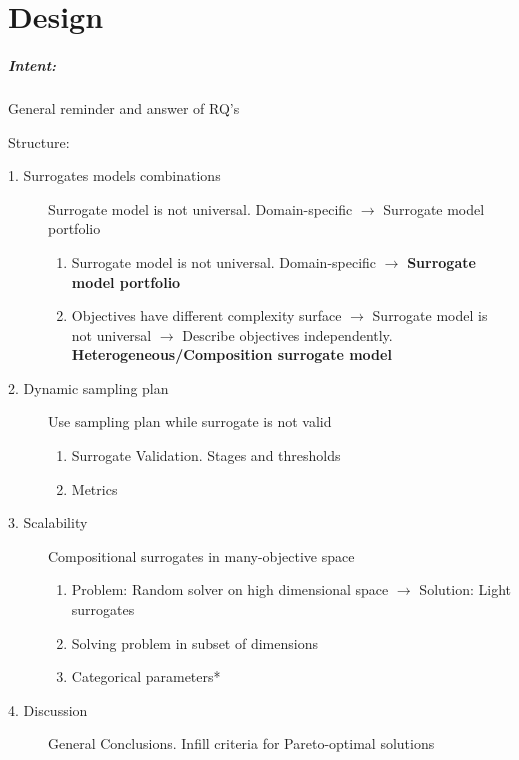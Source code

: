 \chapter{Design}\label{sec:design}

    \begin{blockquote}
        \paragraph{Intent:} General reminder and answer of RQ's
        
        Structure:
        \begin{description}
            \item[1. Surrogates models combinations] Surrogate model is not universal. Domain-specific $\rightarrow$ Surrogate model portfolio 
                \begin{enumerate}
                    \item Surrogate model is not universal. Domain-specific $\rightarrow$ \textbf{Surrogate model portfolio}
                    \item Objectives have different complexity surface $\rightarrow$ Surrogate model is not universal $\rightarrow$ Describe objectives independently. \textbf{Heterogeneous/Composition surrogate model} 
                \end{enumerate}
                  
            \item[2. Dynamic sampling plan] Use sampling plan while surrogate is not valid
                \begin{enumerate}
                    \item Surrogate Validation. Stages and thresholds
                    \item Metrics
                \end{enumerate}

            \item[3. Scalability] Compositional surrogates in many-objective space
                \begin{enumerate}
                    \item Problem: Random solver on high dimensional space $\rightarrow$ Solution: Light surrogates 
                    \item Solving problem in subset of dimensions
                    \item Categorical parameters*
                \end{enumerate}

            \item[4. Discussion] General Conclusions. Infill criteria for Pareto-optimal solutions
        \end{description}
    \end{blockquote}

